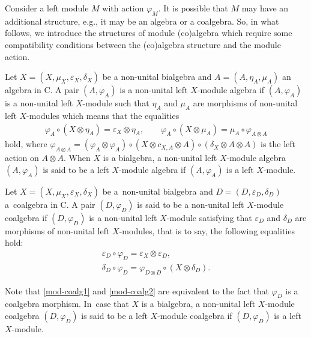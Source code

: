 \documentclass[10pt,a4paper]{amsart}
\numberwithin{equation}{section}
\begin{document}
Consider a left module $M$ with action $\varphi_{M}$. It is possible that $M$ may have an additional structure, e.g., it may be an algebra or a coalgebra. So, in what follows, we introduce the structures of module (co)algebra which require some compatibility conditions between the (co)algebra structure and the module action.
\begin{Definition}
Let $X=(X,\mu_{X},\varepsilon_{X},\delta_{X})$ be a non-unital bialgebra and $A=(A,\eta_{A},\mu_{A})$ an algebra in {\sf C}. A pair $(A,\varphi_{A})$ is a non-unital left $X$-module algebra if $(A,\varphi_{A})$ is a non-unital left $X$-module such that $\eta_{A}$ and $\mu_{A}$ are morphisms of non-unital left $X$-modules which means that the equalities
\begin{gather*}
\varphi_{A}\circ (X\otimes \eta_{A})=\varepsilon_{X}\otimes \eta_{A},\qquad
\varphi_{A}\circ (X\otimes \mu_{A})=\mu_{A}\circ \varphi_{A\otimes A}
\end{gather*}
hold, where $\varphi_{A\otimes A}=(\varphi_{A}\otimes \varphi_{A})\circ (X\otimes c_{X,A}\otimes A)\circ (\delta_{X}\otimes A\otimes A)$ is the left action on $A\otimes A$. When $X$ is a bialgebra, a non-unital left $X$-module algebra $(A,\varphi_{A})$ is said to be a left $X$-module algebra if $(A,\varphi_{A})$ is a left $X$-module.
\end{Definition}
\begin{Definition}
Let $X=(X,\mu_{X},\varepsilon_{X},\delta_{X})$ be a~non-unital bialgebra and $D=(D,\varepsilon_{D},\delta_{D})$ a~coalgebra in {\sf C}. A pair $(D,\varphi_{D})$ is said to be a non-unital left $X$-module coalgebra if $(D,\varphi_{D})$ is a non-unital left $X$-module satisfying that $\varepsilon_{D}$ and $\delta_{D}$ are morphisms of non-unital left $X$-modules, that is to say, the following equalities hold:
\begin{gather}\label{mod-coalg1}
\varepsilon_{D}\circ\varphi_{D}=\varepsilon_{X}\otimes\varepsilon_{D},\\\label{mod-coalg2}\delta_{D}\circ\varphi_{D}=\varphi_{D\otimes D}\circ(X\otimes\delta_{D}).
\end{gather}

Note that \eqref{mod-coalg1} and \eqref{mod-coalg2} are equivalent to the fact that $\varphi_{D}$ is a coalgebra morphism. In~case that $X$ is a bialgebra, a non-unital left $X$-module coalgebra $(D,\varphi_{D})$ is said to be a left $X$-module coalgebra if $(D,\varphi_{D})$ is a left $X$-module.
\end{Definition}
\end{document}

